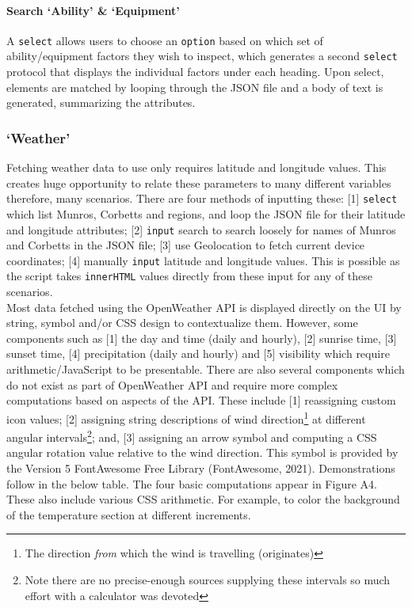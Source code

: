 \documentclass[11pt, english]{article}
\begin{document}
			\paragraph{Search `Ability' \& `Equipment'}

	A \texttt{select} allows users to choose an \texttt{option} based on which set of ability/equipment factors they wish to inspect, which generates a second \texttt{select} protocol that displays the individual factors under each heading. Upon select, elements are matched by looping through the JSON file and a body of text is generated, summarizing the attributes.
	
		\subsubsection{`Weather'}

	Fetching weather data to use only requires latitude and longitude values. This creates huge opportunity to relate these parameters to many different variables therefore, many scenarios. There are four methods of inputting these: [1] \texttt{select} which list Munros, Corbetts and regions, and loop the JSON file for their latitude and longitude attributes; [2] \texttt{input} search to search loosely for names of Munros and Corbetts in the JSON file; [3] use Geolocation to fetch current device coordinates; [4] manually \texttt{input} latitude and longitude values. This is possible as the script takes \texttt{innerHTML} values directly from these input for any of these scenarios.\\

	Most data fetched using the OpenWeather API is displayed directly on the UI by string, symbol and/or CSS design to contextualize them. However, some components such as [1] the day and time (daily and hourly), [2] sunrise time, [3] sunset time, [4] precipitation (daily and hourly) and [5] visibility which require arithmetic/JavaScript to be presentable. There are also several components which do not exist as part of OpenWeather API and require more complex computations based on aspects of the API. These include [1] reassigning custom icon values; [2] assigning string descriptions of wind direction\footnote{The direction \textit{from} which the wind is travelling (originates)} at different angular intervals\footnote{Note there are no precise-enough sources supplying these intervals so much effort with a calculator was devoted}; and, [3] assigning an arrow symbol and computing a CSS angular rotation value relative to the wind direction. This symbol is provided by the Version 5 FontAwesome Free Library (FontAwesome, 2021). Demonstrations follow in the below table. The four basic computations appear in Figure A4. These also include various CSS arithmetic. For example, to color the background of the temperature section at different increments.
\end{document}
